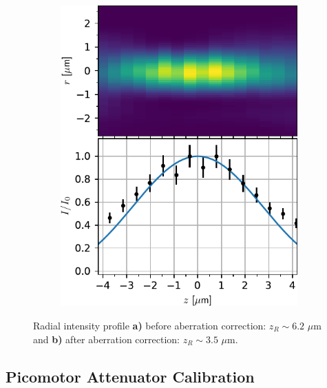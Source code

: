 \begin{figure}
\begin{subfigure}{.49\textwidth}
		\includegraphics[width=\linewidth]{figures/AxialImageTweezerScan.pdf}
		\caption{}
		\label{fig:AxialZernike}
	\end{subfigure}
	\caption{Radial intensity profile \textbf{a)} before aberration correction: $z_R \sim 6.2$ $\mu$m and \textbf{b)} after aberration correction: $z_R \sim 3.5$ $\mu$m.}
	\label{fig:AxialScans}
\end{figure}


\subsection{Picomotor Attenuator Calibration}

